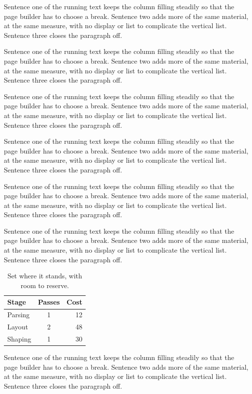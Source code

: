 \documentclass{article}
\begin{document}
Sentence one of the running text keeps the column filling steadily so that the page builder has to choose a break. Sentence two adds more of the same material, at the same measure, with no display or list to complicate the vertical list. Sentence three closes the paragraph off.

Sentence one of the running text keeps the column filling steadily so that the page builder has to choose a break. Sentence two adds more of the same material, at the same measure, with no display or list to complicate the vertical list. Sentence three closes the paragraph off.

Sentence one of the running text keeps the column filling steadily so that the page builder has to choose a break. Sentence two adds more of the same material, at the same measure, with no display or list to complicate the vertical list. Sentence three closes the paragraph off.

Sentence one of the running text keeps the column filling steadily so that the page builder has to choose a break. Sentence two adds more of the same material, at the same measure, with no display or list to complicate the vertical list. Sentence three closes the paragraph off.

Sentence one of the running text keeps the column filling steadily so that the page builder has to choose a break. Sentence two adds more of the same material, at the same measure, with no display or list to complicate the vertical list. Sentence three closes the paragraph off.

Sentence one of the running text keeps the column filling steadily so that the page builder has to choose a break. Sentence two adds more of the same material, at the same measure, with no display or list to complicate the vertical list. Sentence three closes the paragraph off.

\begin{table}[h]
\centering
\begin{tabular}{|l|c|r|}
\hline
Stage & Passes & Cost \\
\hline
Parsing & 1 & 12 \\
Layout & 2 & 48 \\
Shaping & 1 & 30 \\
\hline
\end{tabular}
\caption{Set where it stands, with room to reserve.}
\end{table}

Sentence one of the running text keeps the column filling steadily so that the page builder has to choose a break. Sentence two adds more of the same material, at the same measure, with no display or list to complicate the vertical list. Sentence three closes the paragraph off.
\end{document}
